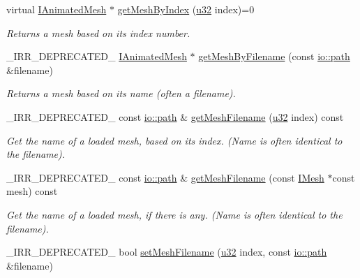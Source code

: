 \begin{DoxyCompactItemize}
virtual \hyperlink{classirr_1_1scene_1_1IAnimatedMesh}{I\+Animated\+Mesh} $\ast$ \hyperlink{classirr_1_1scene_1_1IMeshCache_a06e7755013445f9bc3d7339fbd009e31}{get\+Mesh\+By\+Index} (\hyperlink{namespaceirr_a0416a53257075833e7002efd0a18e804}{u32} index)=0
\begin{DoxyCompactList}\small\item\em Returns a mesh based on its index number. \end{DoxyCompactList}\item 
\+\_\+\+I\+R\+R\+\_\+\+D\+E\+P\+R\+E\+C\+A\+T\+E\+D\+\_\+ \hyperlink{classirr_1_1scene_1_1IAnimatedMesh}{I\+Animated\+Mesh} $\ast$ \hyperlink{classirr_1_1scene_1_1IMeshCache_aa3946324e39cc074b1f73e01d57cae70}{get\+Mesh\+By\+Filename} (const \hyperlink{namespaceirr_1_1io_a6468281622ce3a1c46b72e19f32dded5}{io\+::path} \&filename)
\begin{DoxyCompactList}\small\item\em Returns a mesh based on its name (often a filename). \end{DoxyCompactList}\item 
\+\_\+\+I\+R\+R\+\_\+\+D\+E\+P\+R\+E\+C\+A\+T\+E\+D\+\_\+ const \hyperlink{namespaceirr_1_1io_a6468281622ce3a1c46b72e19f32dded5}{io\+::path} \& \hyperlink{classirr_1_1scene_1_1IMeshCache_afda96c4fb8ab272f3d3688dcaef3abc3}{get\+Mesh\+Filename} (\hyperlink{namespaceirr_a0416a53257075833e7002efd0a18e804}{u32} index) const
\begin{DoxyCompactList}\small\item\em Get the name of a loaded mesh, based on its index. (Name is often identical to the filename). \end{DoxyCompactList}\item 
\+\_\+\+I\+R\+R\+\_\+\+D\+E\+P\+R\+E\+C\+A\+T\+E\+D\+\_\+ const \hyperlink{namespaceirr_1_1io_a6468281622ce3a1c46b72e19f32dded5}{io\+::path} \& \hyperlink{classirr_1_1scene_1_1IMeshCache_adc17a943cd79a94710def8dd7d2de605}{get\+Mesh\+Filename} (const \hyperlink{classirr_1_1scene_1_1IMesh}{I\+Mesh} $\ast$const mesh) const
\begin{DoxyCompactList}\small\item\em Get the name of a loaded mesh, if there is any. (Name is often identical to the filename). \end{DoxyCompactList}\item 
\+\_\+\+I\+R\+R\+\_\+\+D\+E\+P\+R\+E\+C\+A\+T\+E\+D\+\_\+ bool \hyperlink{classirr_1_1scene_1_1IMeshCache_a5b87031dbfdb70a59c00a1b892b74c3d}{set\+Mesh\+Filename} (\hyperlink{namespaceirr_a0416a53257075833e7002efd0a18e804}{u32} index, const \hyperlink{namespaceirr_1_1io_a6468281622ce3a1c46b72e19f32dded5}{io\+::path} \&filename)

\end{DoxyCompactItemize}
